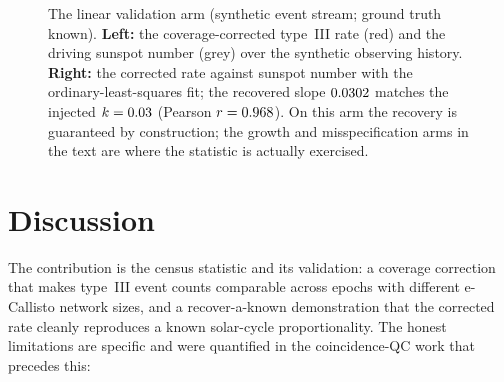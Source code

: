 \documentclass[twocolumn]{aastex631}
\begin{document}
\begin{figure}
\caption{The linear validation arm (synthetic event stream; ground truth known). \textbf{Left:}
the coverage-corrected type~III rate (red) and the driving sunspot number (grey) over the synthetic
observing history. \textbf{Right:} the corrected rate against sunspot number with the
ordinary-least-squares fit; the recovered slope $0.0302$ matches the injected
$k=0.03$ (Pearson $r=0.968$). On this arm the recovery is guaranteed by
construction; the growth and misspecification arms in the text are where the statistic is actually
exercised.}
\label{fig:census}
\end{figure}

\section{Discussion}
\label{sec:disc}
The contribution is the census statistic and its validation: a coverage correction that makes
type~III event counts comparable across epochs with different e-Callisto network sizes, and a
recover-a-known demonstration that the corrected rate cleanly reproduces a known solar-cycle
proportionality. The honest limitations are specific and were quantified in the coincidence-QC work
that precedes this:
\end{document}
